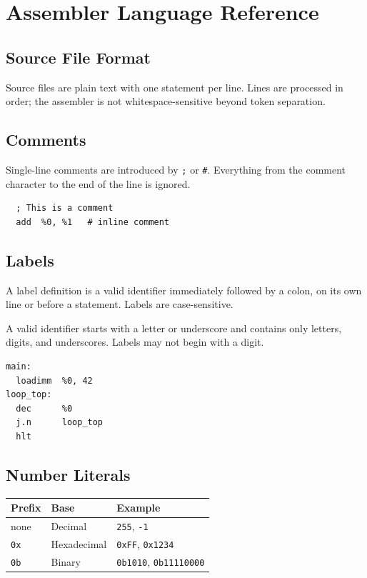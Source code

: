 \documentclass[a4paper,12pt]{report}
\begin{document}
\chapter{Assembler Language Reference}
\label{app:assemblylanguage}

\section{Source File Format}

Source files are plain text with one statement per line. Lines are processed in order; the assembler is not whitespace-sensitive beyond token separation.

\section{Comments}

Single-line comments are introduced by \texttt{;} or \texttt{\#}. Everything from the comment character to the end of the line is ignored.

\begin{lstlisting}
  ; This is a comment
  add  %0, %1   # inline comment
\end{lstlisting}

\section{Labels}

A label definition is a valid identifier immediately followed by a colon, on its own line or before a statement. Labels are case-sensitive.

A valid identifier starts with a letter or underscore and contains only letters, digits, and underscores. Labels may not begin with a digit.

\begin{lstlisting}
main:
  loadimm  %0, 42
loop_top:
  dec      %0
  j.n      loop_top
  hlt
\end{lstlisting}

\section{Number Literals}

\begin{tabularx}{\linewidth}{llX}
\toprule
\textbf{Prefix} & \textbf{Base} & \textbf{Example} \\
\midrule
none   & Decimal     & \texttt{255}, \texttt{-1} \\
\texttt{0x} & Hexadecimal & \texttt{0xFF}, \texttt{0x1234} \\
\texttt{0b} & Binary      & \texttt{0b1010}, \texttt{0b11110000} \\
\bottomrule
\end{tabularx}
\end{document}
